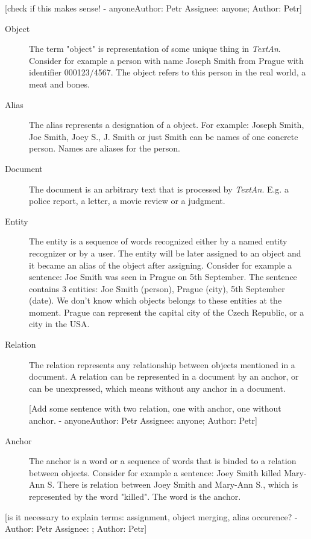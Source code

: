 \documentclass[12pt,a4paper]{report}
\makeatletter
\newcommand{\comment}[3][\@empty]{
  {\color{magenta}[#3 - }
  {\color{green}\ifx\@empty#1\relax Author: #2 \else Assignee: #1; Author: #2\fi}{\color{magenta}]}
}
\newcommand{\textan}{\emph{TextAn}}
\makeatother
\begin{document}
\comment[anyone]{Petr}{check if this makes sense!}
\begin{description}
\item[Object]
The term "object" is representation of some unique thing in \textan{}. Consider
for example a person with name Joseph Smith from Prague with identifier 000123/4567.
The object refers to this person in the real world, a meat and bones.

\item[Alias]
The alias represents a designation of a object. For example: Joseph Smith, Joe
Smith, Joey S., J. Smith or just Smith can be names of one concrete person. Names
are aliases for the person.


\item[Document]
The document is an arbitrary text that is processed by \textan{}. E.g. a police
report, a letter, a movie review or a judgment.

\item[Entity]
The entity is a sequence of words recognized either by a named entity recognizer
or by a user. The entity will be later assigned to an object and it became an alias
of the object after assigning. Consider for example a sentence: Joe Smith was seen
in Prague on 5th September. The sentence contains 3 entities: Joe Smith (person),
Prague (city), 5th September (date). We don't know which objects belongs to these
entities at the moment. Prague can represent the capital city of the Czech Republic,
or a city in the USA.

\item[Relation]
The relation represents any relationship between objects mentioned in a document.
A relation can be represented in a document by an anchor, or can be unexpressed,
which means without any anchor in a document.
\comment[anyone]{Petr}{Add some sentence with two relation, one with anchor, one without anchor.}

\item[Anchor]
The anchor is a word or a sequence of words that is binded to a relation between
objects. Consider for example a sentence: Joey Smith killed Mary-Ann S. There is
relation between Joey Smith and Mary-Ann S., which is represented by the word
"killed". The word is the anchor.
\end{description}

\comment{Petr}{is it necessary to explain terms: assignment, object merging, alias occurence?}
\end{document}
